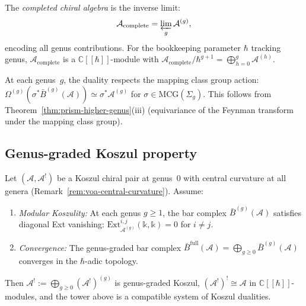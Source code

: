 \begin{definition}\label{def:completed-chiral-algebra}
The \emph{completed chiral algebra} is the inverse limit:
\[
\mathcal{A}_{\mathrm{complete}}
= \varprojlim_g \mathcal{A}^{(g)},
\]
encoding all genus contributions.  For the bookkeeping parameter $\hbar$ tracking genus,
$\mathcal{A}_{\mathrm{complete}}$ is a $\mathbb{C}[\![\hbar]\!]$-module with
$\mathcal{A}_{\mathrm{complete}} / \hbar^{g+1} = \bigoplus_{h=0}^{g} \mathcal{A}^{(h)}$.
\end{definition}

\begin{remark}\label{rem:modular-invariance-tower}
At each genus~$g$, the duality respects the mapping class group action:
$\Omega^{(g)}(\sigma^* \bar{B}^{(g)}(\mathcal{A})) \simeq \sigma^* \mathcal{A}^{(g)}$
for $\sigma \in \mathrm{MCG}(\Sigma_g)$.
This follows from Theorem~\ref{thm:prism-higher-genus}(iii) (equivariance of the
Feynman transform under the mapping class group).
\end{remark}

\subsection{Genus-graded Koszul property}

\begin{theorem}
\label{thm:genus-graded-koszul}\label{thm:genus-graded-koszul-duality}\label{thm:extended-koszul}
Let $(\mathcal{A}, \mathcal{A}^!)$ be a Koszul chiral pair at genus~0
with central curvature at all genera (Remark~\ref{rem:voa-central-curvature}).
Assume:
\begin{enumerate}
\item \emph{Modular Koszulity:} At each genus $g \geq 1$, the bar complex
$\bar{B}^{(g)}(\mathcal{A})$ satisfies diagonal Ext vanishing:
$\mathrm{Ext}^{i,j}_{\mathcal{A}^{(g)}}(\mathbb{k}, \mathbb{k}) = 0$ for $i \neq j$.
\item \emph{Convergence:} The genus-graded bar complex
$\bar{B}^{\mathrm{full}}(\mathcal{A}) = \bigoplus_{g \geq 0} \bar{B}^{(g)}(\mathcal{A})$
converges in the $\hbar$-adic topology.
\end{enumerate}
Then $\mathcal{A}^! := \bigoplus_{g \geq 0} (\mathcal{A}^!)^{(g)}$
is genus-graded Koszul, $(\mathcal{A}^!)^! \cong \mathcal{A}$ in
$\mathbb{C}[\![\hbar]\!]$-modules, and the tower above is a compatible
system of Koszul dualities.
\end{theorem}


